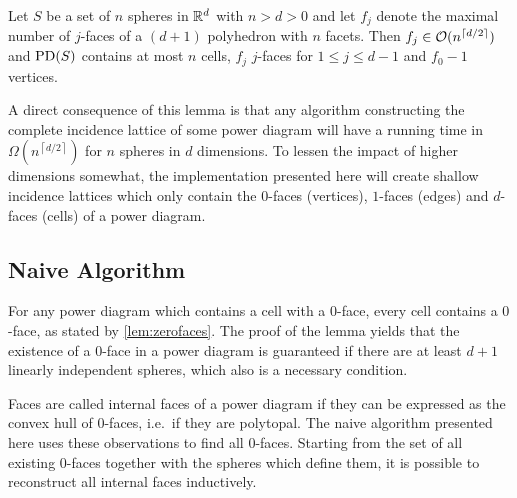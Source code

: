 \begin{lemma}
    \label{lem:latticesexponential}
    Let $S$ be a set of $n$ spheres in $\mathbb{R}^d$ with $n > d > 0$ and let $f_j$ denote the maximal number of $j$-faces of a $(d + 1)$ polyhedron with $n$ facets. Then $f_j \in \mathcal{O}(n^{\left\lceil d/2 \right\rceil})$ and $\operatorname{PD}(S)$ contains at most $n$ cells, $f_j$ $j$-faces for $1 \leq j \leq d-1$ and $f_0 - 1$ vertices.
\end{lemma}

A direct consequence of this lemma is that any algorithm constructing the complete incidence lattice of some power diagram will have a running time in $\Omega(n^{\left\lceil d/2 \right\rceil})$ for $n$ spheres in $d$ dimensions.
To lessen the impact of higher dimensions somewhat, the implementation presented here will create shallow incidence lattices which only contain the $0$-faces (vertices), $1$-faces (edges) and $d$-faces (cells) of a power diagram.

\subsection{Naive Algorithm}
\label{sub:naive_algorithm}
For any power diagram which contains a cell with a $0$-face, every cell contains a $0$-face, as stated by \cref{lem:zerofaces}.
The proof of the lemma yields that the existence of a $0$-face in a power diagram is guaranteed if there are at least $d+1$ linearly independent spheres, which also is a necessary condition.

Faces are called internal faces of a power diagram if they can be expressed as the convex hull of $0$-faces, i.e.~if they are polytopal.
The naive algorithm presented here uses these observations to find all $0$-faces.
Starting from the set of all existing $0$-faces together with the spheres which define them, it is possible to reconstruct all internal faces inductively.


